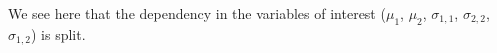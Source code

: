 \documentclass[11pt, a4paper]{article}
\begin{document}
We see here that the dependency in the variables of interest ($ \mu_1$, $\mu_2$, $ \sigma_{1,1}$, $\sigma_{2,2}$, $\sigma_{1,2}$) is split.
\begin{comment}
\subsection{Derivatives of the composite likelihood}
\subsubsection{With respect to $\mu_{1}$/$\mu_{2}$}
$\mu_1$, $\mu_2$ play symetric roles. 
\begin{equation}
\frac{\partial \mathrm{h}_{(\mu',\Sigma'\mid X)}}{\partial \mu_1}(z_1,z_2,Y_1,Y_2) = X (Y_1- \mathrm{e}^{X \mu_1 +z_1}) \mathrm{h}_{(\mu', \Sigma'\mid X)}(z_1,z_2,Y_1,Y_2)
\end{equation}

Derivating under the $ \int$ and composing with the derivative of the logarithm, we have :

\begin{align}
\frac{\partial \mathrm{H}_{(\mu',\Sigma' \mid X)}}{\partial \mu_1}(Y_1,Y_2) & = &  \frac{\int_{\mathbb{R}^2} X(Y_1- \mathrm{e}^{X\mu_1+z_1 }) \mathrm{h}_{(\mu',\Sigma' \mid X)}(z_1,z_2,Y_1,Y_2) \mathrm{d}z_1 \mathrm{d}z_2}{\int_{\mathbb{R}^2}\mathrm{h}_{(\mu',\Sigma' \mid X)}(z_1,z_2,Y_1,Y_2) \mathrm{d}z_1 \mathrm{d}z_2}\\
& = & X ( Y_1- (Y_1 + 1) \frac{p_{(\mu', \Sigma' \mid X)}(Y_1 +1, Y_2)}{p_{(\mu', \Sigma' \mid X)}(Y_1 , Y_2)})
\end{align}

\subsubsection{With respect to $\sigma_{1,1}$/$\sigma_{2,2}$}
In order to derive with respetc to the $\sigma$ variables we have to consider the reciprocal of the $\Sigma'$-matrix. So one have :
\begin{equation}
g_{(0,\Sigma')} (z_1,z_2) = \frac{1}{2 \pi \sqrt{\mid \sigma_{11} \sigma_{22}- \sigma_{12}^2 \mid}} \mathrm{e}^{-\frac{1}{2}\frac{2 \sigma_{12} z_1 z_2 - \sigma_{22} z_1^2 - \sigma_{11} z_2^2}{\sigma_{12}^2-\sigma_{11} \sigma_{22}}}
\end{equation}

Here again $\sigma_{1,1}$ and $\sigma_{2,2}$ play symetric roles.

We note $\frac{(-) \sigma_{22}}{4 \pi (\mid \sigma_{11} \sigma_{22}- \sigma_{12}^2 \mid ) ^{\frac{3}{2}} }$ the derivative of $ \frac{1}{2 \pi \sqrt{\mid \sigma_{11} \sigma_{22}- \sigma_{12}^2 \mid}}$ with respect to $\sigma_{11}$ depending on the sign of $ \sigma_{11} \sigma_{22}- \sigma_{12}^2 $.
\begin{equation}
\frac{\partial g_{(0,\Sigma ')}}{\partial \sigma_{11}} (z_1,z_2) = ( \frac{(-) \sigma_{22}}{2 (\mid \sigma_{12}^2- \sigma_{11} \sigma_{22} \mid)^{\frac{3}{2}}} - ( \frac{\sigma_{12} z_{2} - \sigma_{22} z_{1}}{(\sigma_{12}^2- \sigma_{11} \sigma_{22})})^2 ) g_{(0,\Sigma')}(z_1,z_2)
\end{equation}


\end{comment}
\end{document}
